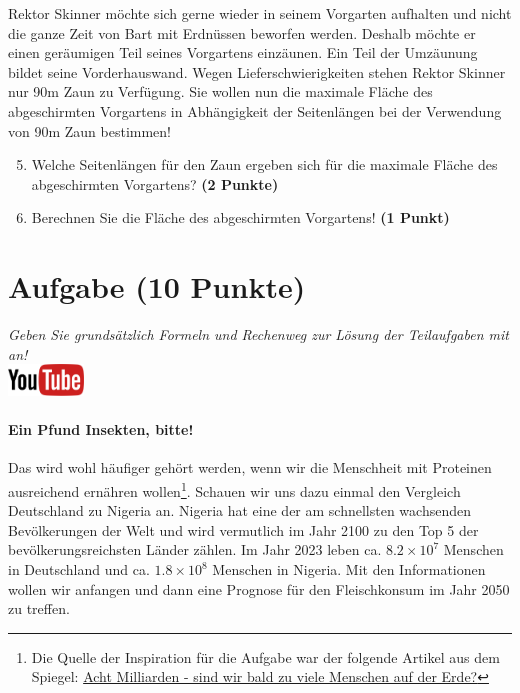 \documentclass[a4paper, 9pt]{scrartcl}\usepackage[]{graphicx}\usepackage[]{xcolor}
\begin{document}
Rektor Skinner m{\"o}chte sich gerne wieder in seinem Vorgarten aufhalten und
nicht die ganze Zeit von Bart mit Erdn{\"u}ssen beworfen werden. Deshalb m{\"o}chte
er einen ger{\"a}umigen Teil seines Vorgartens einz{\"a}unen. Ein Teil der
Umz{\"a}unung bildet seine Vorderhauswand. Wegen Lieferschwierigkeiten stehen
Rektor Skinner nur 90m Zaun zu Verf{\"u}gung. Sie wollen nun die
maximale Fl{\"a}che des abgeschirmten Vorgartens in Abh{\"a}ngigkeit der
Seitenl{\"a}ngen bei der Verwendung von 90m Zaun bestimmen!

\begin{enumerate}
  \setcounter{enumi}{4}  
\item  Welche Seitenl{\"a}ngen f{\"u}r den Zaun ergeben sich f{\"u}r die
  maximale Fl{\"a}che des abgeschirmten Vorgartens? \textbf{(2 Punkte)}
\item Berechnen Sie die Fl{\"a}che des abgeschirmten Vorgartens! \textbf{(1
    Punkt)}
\end{enumerate}

 
\clearpage

\section{Aufgabe \hfill (10 Punkte)}

\textit{Geben Sie grunds{\"a}tzlich Formeln und Rechenweg zur L{\"o}sung der
  Teilaufgaben mit an!} \\[1Ex]

\hfill\href{https://youtu.be/OhyuH6hzEhY}{\includegraphics[width = 2cm]{img/youtube}} %
\hspace{2Ex}




\paragraph{Ein Pfund Insekten, bitte!} Das wird wohl h{\"a}ufiger geh{\"o}rt
werden, wenn wir die Menschheit mit Proteinen ausreichend ern{\"a}hren
wollen\footnote{Die Quelle der Inspiration f{\"u}r die Aufgabe war der folgende
  Artikel aus dem Spiegel:
  \href{https://www.spiegel.de/ausland/ueberbevoelkerung-acht-milliarden-sind-wir-bald-zu-viele-menschen-auf-der-erde-a-3f20c7bc-3d60-4440-9f52-eb338db207f5}{Acht
    Milliarden - sind wir bald zu viele Menschen auf der Erde?}}. Schauen
wir uns dazu einmal den Vergleich Deutschland zu Nigeria an. Nigeria hat
eine der am schnellsten wachsenden Bev{\"o}lkerungen der Welt und wird
vermutlich im Jahr 2100 zu den Top 5 der bev{\"o}lkerungsreichsten L{\"a}nder
z{\"a}hlen. Im Jahr 2023 leben ca. \ensuremath{8.2\times 10^{7}} Menschen in
Deutschland und ca. \ensuremath{1.8\times 10^{8}} Menschen in Nigeria. Mit den
Informationen wollen wir anfangen und dann eine Prognose f{\"u}r den
Fleischkonsum im Jahr 2050 zu treffen. \\ 
\end{document}
